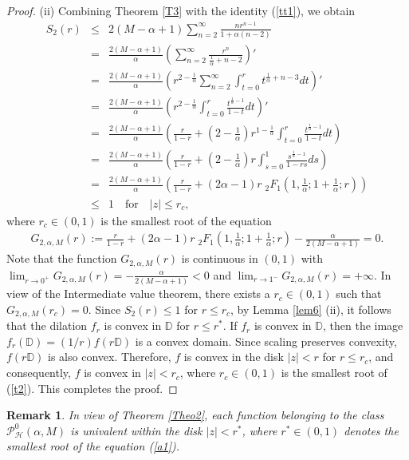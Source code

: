\documentclass[11pt,reqno]{amsart}
\newtheorem{rem}{Remark}[section]
\newtheorem{open problem}{Open problem}[section]
\newcommand{\beas}{\begin{eqnarray*}}
\newcommand{\eeas}{\end{eqnarray*}}
\newcommand{\bea}{\begin{eqnarray}}
\newcommand{\eea}{\end{eqnarray}}
\numberwithin{equation}{section}
\begin{document}
\begin{proof}
\noindent (ii) Combining \textrm{Theorem \ref{T3}} with the identity (\ref{tt1}), we obtain  
\beas S_2(r)&\leq&2(M-\alpha+1)\sum_{n=2}^{\infty}\frac{nr^{n-1}}{1+\alpha (n-2)}\hspace{3cm}\\[1mm]
&=&\frac{2(M-\alpha+1)}{\alpha}\left(\sum_{n=2}^{\infty}\frac{r^{n}}{\frac{1}{\alpha}+n-2}\right)'\\[1mm]
&=&\frac{2(M-\alpha+1)}{\alpha}\left(r^{2-\frac{1}{\alpha}}\sum_{n=2}^{\infty}\int_{t=0}^r t^{\frac{1}{\alpha}+n-3}dt\right)'\\[1mm]
&=&\frac{2(M-\alpha+1)}{\alpha}\left(r^{2-\frac{1}{\alpha}}\int_{t=0}^r \frac{t^{\frac{1}{\alpha}-1}}{1-t}dt\right)'\\[1mm]
&=&\frac{2(M-\alpha+1)}{\alpha}\left(\frac{r}{1-r}+\left(2-\frac{1}{\alpha}\right)r^{1-\frac{1}{\alpha}}\int_{t=0}^r \frac{t^{\frac{1}{\alpha}-1}}{1-t}dt\right)\\[1mm]
&=&\frac{2(M-\alpha+1)}{\alpha}\left(\frac{r}{1-r}+\left(2-\frac{1}{\alpha}\right)r\int_{s=0}^1 \frac{s^{\frac{1}{\alpha}-1}}{1-rs}ds\right)\\[1mm]
&=&\frac{2(M-\alpha+1)}{\alpha}\left(\frac{r}{1-r}+\left(2\alpha-1\right)r\;{}_2F_1\left(1,\frac{1}{\alpha};1+\frac{1}{\alpha}; r\right)\right)\\[1mm]\
&\leq& 1\quad\text{for}\quad |z|\leq r_c,\eeas
where $r_c\in(0,1)$ is the smallest root of the equation 
\bea\label{t2} G_{2,\alpha,M}(r):=\frac{r}{1-r}+\left(2\alpha-1\right)r\;{}_2F_1\left(1,\frac{1}{\alpha};1+\frac{1}{\alpha}; r\right)-\frac{\alpha}{2(M-\alpha+1)}=0.\eea
Note that the function $G_{2,\alpha,M}(r)$ is continuous in $(0,1)$ with $\lim_{r\to 0^+} G_{2,\alpha,M}(r)=-\frac{\alpha}{2(M-\alpha+1)}<0$ and $\lim_{r\to 1^-} G_{2,\alpha,M}(r)=+\infty$. In view of the Intermediate value theorem, there exists a $r_c\in(0,1)$ such that $G_{2,\alpha,M}(r_c)=0$. Since $S_2(r) \leq 1$ for $r \leq r_c$, by 
\textrm{Lemma \ref{lem6}} (ii), it follows that the dilation $f_r$ is convex in $\mathbb{D}$ for $r \leq r^*$. 
If $f_r$ is convex in $\mathbb{D}$, then the image $f_r(\mathbb{D}) = (1/r)f(r\mathbb{D})$ is a convex domain. Since scaling preserves convexity, $f(r\mathbb{D})$ 
is also convex. Therefore, $f$ is convex in the disk $|z| < r$ for $r \leq r_c$, and consequently, $f$ is convex in $|z| < r_c$, where $r_c\in(0,1)$ is the smallest root of (\ref{t2}).
This completes the proof.\end{proof}
\begin{rem} In view of \textrm{Theorem \ref{Theo2}}, each function belonging to the class $\mathcal{P}_{\mathcal{H}}^0(\alpha,M)$ is univalent within the disk $|z|< r^*$, where $r^*\in(0, 1)$ denotes the smallest root of the equation (\ref{a1}).
\end{rem}
\end{document}
